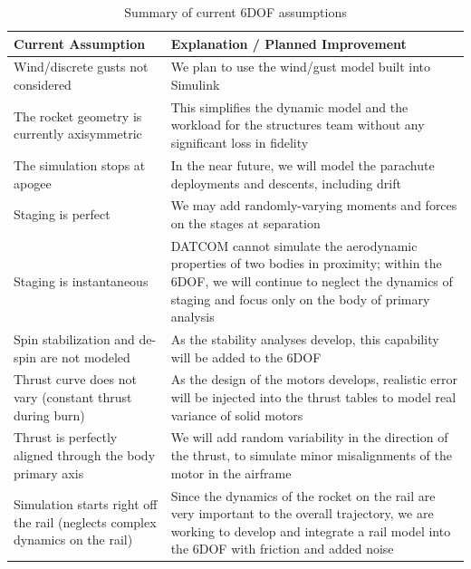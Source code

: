 \begin{table}
    \centering
    \begin{tabularx}{0.95\textwidth}{|>{\raggedright\arraybackslash}p{}|>{\raggedright\arraybackslash}X|}
        \hline
        \textbf{Current Assumption} & \textbf{Explanation / Planned Improvement} \\ \hline
        Wind/discrete gusts not considered & We plan to use the wind/gust model built into Simulink \\ \hline
        The rocket geometry is currently axisymmetric & This simplifies the dynamic model and the workload for the structures team without any significant loss in fidelity \\ \hline
        The simulation stops at apogee & In the near future, we will model the parachute deployments and descents, including drift \\ \hline
        Staging is perfect & We may add randomly-varying moments and forces on the stages at separation \\ \hline
        Staging is instantaneous & DATCOM cannot simulate the aerodynamic properties of two bodies in proximity; within the 6DOF, we will continue to neglect the dynamics of staging and focus only on the body of primary analysis \\ \hline
        Spin stabilization and de-spin are not modeled & As the stability analyses develop, this capability will be added to the 6DOF \\ \hline
        Thrust curve does not vary (constant thrust during burn) & As the design of the motors develops, realistic error will be injected into the thrust tables to model real variance of solid motors \\ \hline
        Thrust is perfectly aligned through the body primary axis & We will add random variability in the direction of the thrust, to simulate minor misalignments of the motor in the airframe \\ \hline
        Simulation starts right off the rail (neglects complex dynamics on the rail) & Since the dynamics of the rocket on the rail are very important to the overall trajectory, we are working to develop and integrate a rail model into the 6DOF with friction and added noise \\ \hline
    \end{tabularx}
    \caption{Summary of current 6DOF assumptions}
    \label{table:6dof-assumptions}
\end{table}

